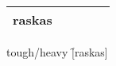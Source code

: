 \begin{center}
  \begin{tabular}{|c c c c c|}
    \hline
      raskas &&&& \\
    \hline
  \end{tabular}
\end{center}

\begin{questions}
  \begin{multicols}{3}
    \raggedcolumns
    \question tough/heavy \f[raskas]
  \end{multicols}
\end{questions}
